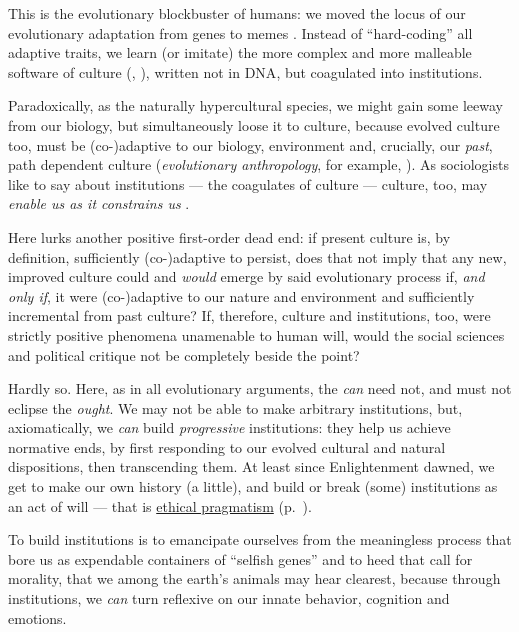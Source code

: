 This is the evolutionary blockbuster of humans:
we moved the locus of our evolutionary adaptation from genes to memes \citep{Dawkins1976}.
Instead of ``hard-coding'' all adaptive traits, we learn (or imitate) the more complex and more malleable software of culture (\citealt{Boyd1985}, \citealt[K196ff]{Henrich2007}), written not in \gls{DNA}, but coagulated into institutions.

Paradoxically, as the naturally hypercultural species, we might gain some leeway from our biology, but simultaneously loose it to culture, because evolved culture too, must be (co-)adaptive to our biology, environment and, crucially, our \emph{past}, path dependent culture (\emph{evolutionary anthropology}, for example, \citealt{Wright2000}).
As sociologists like to say about institutions --- the coagulates of culture --- culture, too, may \emph{enable us as it constrains us} \citep[for example,][3]{Hodgson2006}.

Here lurks another positive first-order dead end:
if present culture is, by definition, sufficiently (co-)adaptive to persist, does that not imply that any new, improved culture could and \emph{would} emerge by said evolutionary process if, \emph{and only if}, it were (co-)adaptive to our nature and environment and sufficiently incremental from past culture?
If, therefore, culture and institutions, too, were strictly positive phenomena unamenable to human will, would the social sciences and political critique not be completely beside the point? %

Hardly so.
Here, as in all evolutionary arguments, the \emph{can} need not, and must not eclipse the \emph{ought}.
We may not be able to make arbitrary institutions, but, axiomatically, we \emph{can} build \emph{progressive} institutions:
they help us achieve normative ends, by first responding to our evolved cultural and natural dispositions, then transcending them.
At least since Enlightenment dawned, we get to make our own history (a little), and build or break (some) institutions as an act of will --- that is \hyperref[itm:pragmatic-ethics]{ethical pragmatism} (p.~\pageref{itm:pragmatic-ethics}).

To build institutions is to emancipate ourselves from the meaningless process that bore us as expendable containers of ``selfish genes'' \citep{Dawkins1976} and to heed that call for morality, that we among the earth's animals may hear clearest, because through institutions, we \emph{can} turn reflexive on our innate behavior, cognition and emotions.

